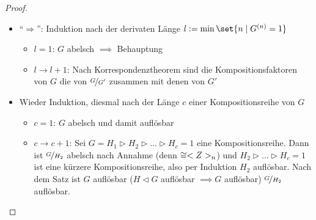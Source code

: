 \begin{proof}
	\begin{itemize}
		\item ``$\Rightarrow$'': Induktion nach der derivaten Länge $l := \min\set{n \mid G^{(n)} = 1}$
		\begin{itemize}
			\item $l=1$: $G$ abelsch $\implies$ Behauptung
			\item $l \to l+1$: Nach Korrespondenztheorem sind die Kompositionsfaktoren von $G$ die von $\lnkset{G}{G'}$ zusammen mit denen von $G'$
		\end{itemize}
		\item Wieder Induktion, diesmal nach der Länge $c$ einer Kompositionsreihe von $G$
		\begin{itemize}
			\item $c=1$: $G$ abelsch und damit auflösbar
			\item $c \to c+1$: Sei $G = H_1 \rhd H_2 \rhd \dots \rhd H_c =1$ eine Kompositionsreihe. Dann ist $\lnkset{G}{H_2}$ abelsch nach Annahme (denn $\cong <Z>_n$) und $H_2 \rhd \dots \rhd H_c =1$ ist eine kürzere Kompositionsreihe, also per Induktion $H_2$ auflösbar. Nach dem Satz ist $G$ auflösbar ($H \lhd G$ auflösbar $\implies G$ auflösbar) $\lnkset{G}{H_2}$ auflösbar.
		\end{itemize}
	\end{itemize}
\end{proof}
